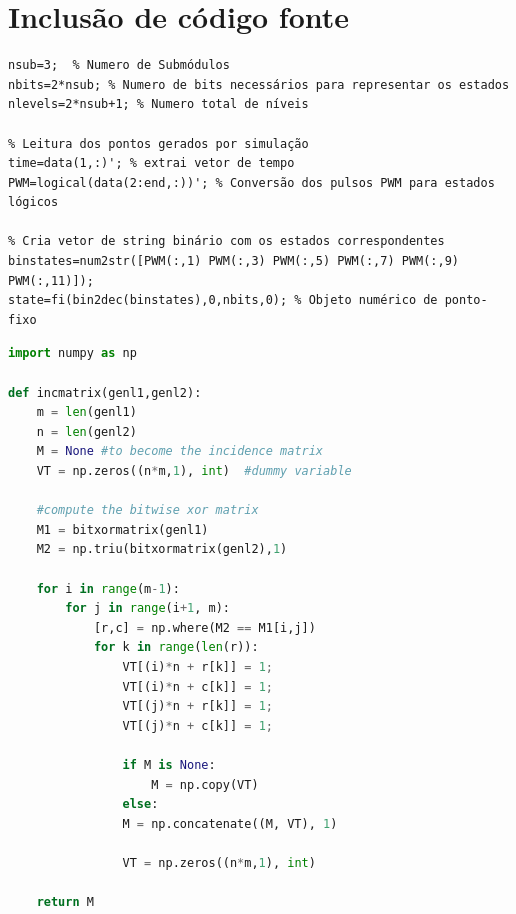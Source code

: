 \section{Inclusão de código fonte}\label{sec-codeinsert}

\begin{lstlisting}[caption={[Leitura dos dados simulados e conversão para estados topológicos.]{Leitura
    dos dados simulados e conversão para estados topológicos. -- \showfont}},label={lst:leituradadossim}]
% Pré definições iniciais
nsub=3;  % Numero de Submódulos
nbits=2*nsub; % Numero de bits necessários para representar os estados
nlevels=2*nsub+1; % Numero total de níveis

% Leitura dos pontos gerados por simulação
time=data(1,:)'; % extrai vetor de tempo
PWM=logical(data(2:end,:))'; % Conversão dos pulsos PWM para estados lógicos

% Cria vetor de string binário com os estados correspondentes
binstates=num2str([PWM(:,1) PWM(:,3) PWM(:,5) PWM(:,7) PWM(:,9) PWM(:,11)]);
state=fi(bin2dec(binstates),0,nbits,0); % Objeto numérico de ponto-fixo

\end{lstlisting}



\begin{lstlisting}[language=Python,caption={[Python example]{Python example -- \showfont}}]
import numpy as np

def incmatrix(genl1,genl2):
    m = len(genl1)
    n = len(genl2)
    M = None #to become the incidence matrix
    VT = np.zeros((n*m,1), int)  #dummy variable

    #compute the bitwise xor matrix
    M1 = bitxormatrix(genl1)
    M2 = np.triu(bitxormatrix(genl2),1)

    for i in range(m-1):
        for j in range(i+1, m):
            [r,c] = np.where(M2 == M1[i,j])
            for k in range(len(r)):
                VT[(i)*n + r[k]] = 1;
                VT[(i)*n + c[k]] = 1;
                VT[(j)*n + r[k]] = 1;
                VT[(j)*n + c[k]] = 1;

                if M is None:
                    M = np.copy(VT)
                else:
                M = np.concatenate((M, VT), 1)

                VT = np.zeros((n*m,1), int)

    return M
\end{lstlisting}




